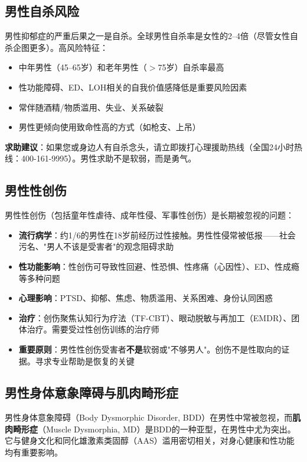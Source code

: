 \begin{enumerate}
\subsection{男性自杀风险}

男性抑郁症的严重后果之一是自杀。全球男性自杀率是女性的2--4倍（尽管女性自杀企图更多）。高风险特征：

\begin{itemize}[leftmargin=2cm]
	\item 中年男性（45--65岁）和老年男性（$>$75岁）自杀率最高
	\item 性功能障碍、ED、LOH相关的自我价值感降低是重要风险因素
	\item 常伴随酒精/物质滥用、失业、关系破裂
	\item 男性更倾向使用致命性高的方式（如枪支、上吊）
\end{itemize}

\textbf{求助建议}：如果您或身边人有自杀念头，请立即拨打心理援助热线（全国24小时热线：400-161-9995）。男性求助不是软弱，而是勇气。

\subsection{男性性创伤}

男性性创伤（包括童年性虐待、成年性侵、军事性创伤）是长期被忽视的问题：

\begin{itemize}[leftmargin=2cm]
	\item \textbf{流行病学}：约1/6的男性在18岁前经历过性接触。男性性侵常被低报——社会污名、"男人不该是受害者"的观念阻碍求助
	\item \textbf{性功能影响}：性创伤可导致性回避、性恐惧、性疼痛（心因性）、ED、性成瘾等多种问题
	\item \textbf{心理影响}：PTSD、抑郁、焦虑、物质滥用、关系困难、身份认同困惑
	\item \textbf{治疗}：创伤聚焦认知行为疗法（TF-CBT）、眼动脱敏与再加工（EMDR）、团体治疗。需要受过性创伤训练的治疗师
	\item \textbf{重要原则}：男性性创伤受害者\textbf{不是}软弱或"不够男人"。创伤不是性取向的证据。寻求专业帮助是恢复的关键
\end{itemize}

\subsection{男性身体意象障碍与肌肉畸形症}
\label{subsec:muscle_dysmorphia}

男性身体意象障碍（Body Dysmorphic Disorder, BDD）在男性中常被忽视，而\textbf{肌肉畸形症}（Muscle Dysmorphia, MD）是BDD的一种亚型，在男性中尤为突出。它与健身文化和同化雄激素类固醇（AAS）滥用密切相关，对身心健康和性功能均有重要影响。


\end{enumerate}
